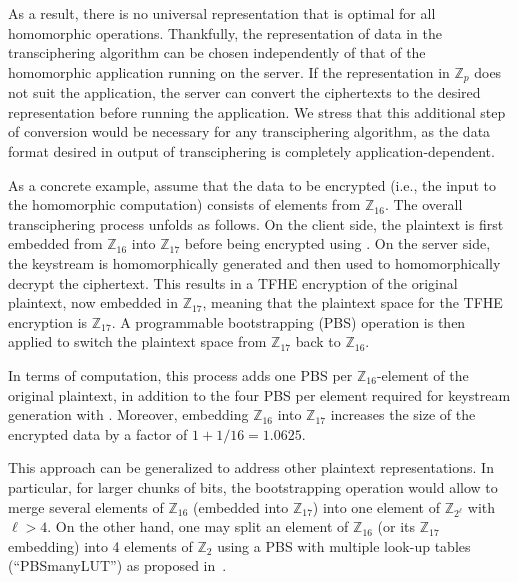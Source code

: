 As a result, there is no universal representation that is optimal for all homomorphic operations. Thankfully, the representation of data in the transciphering algorithm can be chosen independently of that of the homomorphic application running on the server. If the representation in $\mathbb Z_p$ does not suit the application, the server can convert the ciphertexts to the desired representation before running the application. %
We stress that this additional step of conversion would be necessary for any transciphering algorithm, as the data format desired in output of transciphering is completely application-dependent.

	
As a concrete example, assume that the data to be encrypted (i.e., the input to the homomorphic computation) consists of elements from $\mathbb{Z}_{16}$. The overall transciphering process unfolds as follows. On the client side, the plaintext is first embedded from $\mathbb{Z}_{16}$ into $\mathbb{Z}_{17}$ before being encrypted using \coolName. On the server side, the keystream is homomorphically generated and then used to homomorphically decrypt the ciphertext. This results in a \gls{TFHE} encryption of the original plaintext, now embedded in $\mathbb{Z}_{17}$, meaning that the plaintext space for the \gls{TFHE} encryption is $\mathbb{Z}_{17}$. A programmable bootstrapping (\gls{PBS}) operation is then applied to switch the plaintext space from $\mathbb{Z}_{17}$ back to $\mathbb{Z}_{16}$.

In terms of computation, this process adds one \gls{PBS} per $\mathbb{Z}_{16}$-element of the original plaintext, in addition to the four \gls{PBS} per element required for keystream generation with \coolName. Moreover, embedding $\mathbb{Z}_{16}$ into $\mathbb{Z}_{17}$ increases the size of the encrypted data by a factor of $1 + 1/16 = 1.0625$.

This approach can be generalized to address other plaintext representations. In particular, for larger chunks of bits, the bootstrapping operation would allow to merge several elements of $\mathbb{Z}_{16}$ (embedded into $\mathbb{Z}_{17}$) into one element of $\mathbb{Z}_{2^\ell}$ with $\ell > 4$. On the other hand, one may split an element of $\mathbb{Z}_{16}$ (or its $\mathbb{Z}_{17}$ embedding) into 4 elements of $\mathbb{Z}_{2}$ using a \gls{PBS} with multiple look-up tables (``PBSmanyLUT'') as proposed in~\cite{AC:CLOT21}.



